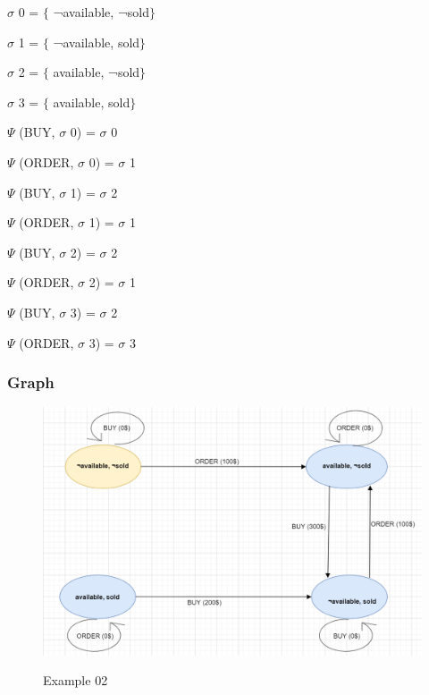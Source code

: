 \documentclass[11pt]{article}
\begin{document}
$ \sigma $ 0 = $ \{ $ ¬available, ¬sold$ \} $ \par

$ \sigma $ 1 = $ \{ $ ¬available, sold$ \} $ \par

$ \sigma $ 2 = $ \{ $ available, ¬sold$ \} $ \par

$ \sigma $ 3 = $ \{ $ available, sold$ \} $ \par
  \(  \Psi  \)  (BUY, $ \sigma $ 0) = $ \sigma $ 0\par

  \(  \Psi  \)  (ORDER, $ \sigma $ 0) = $ \sigma $ 1\par

  \(  \Psi  \)  (BUY, $ \sigma $ 1) = $ \sigma $ 2\par

 \(  \Psi  \)  (ORDER, $ \sigma $ 1) = $ \sigma $ 1\par

 \(  \Psi  \)  (BUY, $ \sigma $ 2) = $ \sigma $ 2\par

 \(  \Psi  \)  (ORDER, $ \sigma $ 2) = $ \sigma $ 1\par

 \(  \Psi  \)  (BUY, $ \sigma $ 3) = $ \sigma $ 2\par

 \(  \Psi  \)  (ORDER, $ \sigma $ 3) = $ \sigma $ 3\par
\pagebreak
\subsubsection{Graph}\label{par:p402}
\begin{figure}[H]
\includegraphics[width=1\linewidth, height=0.3\textheight]{./media/image1.png}
\label{Figure:f02}
\caption{Example 02}
\end{figure}
\end{document}
